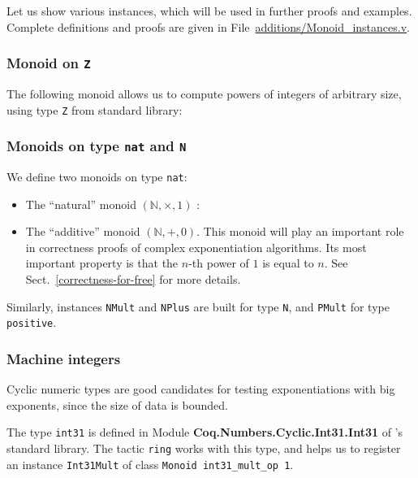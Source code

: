 Let us show various instances, which will be used in further proofs and examples.
Complete definitions and proofs are given in 
File~\href{../theories/html/additions.Monoid_instances.html}{additions/Monoid\_instances.v}.


\subsubsection{Monoid on \texttt{Z}}
The following monoid allows us to compute powers of integers of arbitrary size, 
using type \texttt{Z} from standard library:




\subsubsection{Monoids on type \texttt{nat} and \texttt{N}}
\label{nat-monoids}

We define two monoids on type \texttt{nat}:
\begin{itemize}
\item The ``natural'' monoid $(\mathbb{N},\times, 1)$ :



\item The ``additive''  monoid $(\mathbb{N},+, 0)$.
This monoid will play an important role in correctness proofs of complex
exponentiation algorithms. Its most important property is that the $n$-th 
power of $1$ is equal to $n$. See Sect.~\vref{correctness-for-free} for more details.

\end{itemize}

Similarly, instances \texttt{NMult} and  \texttt{NPlus}  are built for type \texttt{N}, and
\texttt{PMult} for type \texttt{positive}.

\subsubsection{Machine integers}

Cyclic numeric types are  good candidates for testing exponentiations
with big exponents, since the size of data is bounded.

The type \texttt{int31} is defined  in Module
\textbf{Coq.Numbers.Cyclic.Int31.Int31} of \coq's standard library. The tactic \texttt{ring} works 
with this type, and helps us to register an instance \texttt{Int31Mult} of class  \texttt{Monoid int31\_mult\_op 1}.

